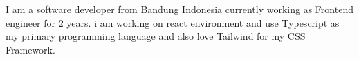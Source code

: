 

\begin{cvparagraph}

I am a software developer from Bandung Indonesia currently working as Frontend engineer for 2 years. i am working on react environment and use Typescript as my primary programming language and also love Tailwind for my CSS Framework.
\end{cvparagraph}